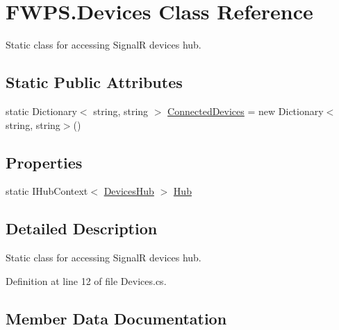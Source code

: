 \hypertarget{class_f_w_p_s_1_1_devices}{}\section{F\+W\+P\+S.\+Devices Class Reference}
\label{class_f_w_p_s_1_1_devices}


Static class for accessing SignalR devices hub.  


\subsection*{Static Public Attributes}
\begin{DoxyCompactItemize}
\item 
static Dictionary$<$ string, string $>$ \mbox{\hyperlink{class_f_w_p_s_1_1_devices_a8334d36e787ab0a9c07a05974bbb5ee0}{Connected\+Devices}} = new Dictionary$<$string, string$>$()
\end{DoxyCompactItemize}
\subsection*{Properties}
\begin{DoxyCompactItemize}
\item 
static I\+Hub\+Context$<$ \mbox{\hyperlink{class_f_w_p_s_1_1_devices_hub}{Devices\+Hub}} $>$ \mbox{\hyperlink{class_f_w_p_s_1_1_devices_a417be10bd7ef62349833bb0d6d32c235}{Hub}}
\end{DoxyCompactItemize}


\subsection{Detailed Description}
Static class for accessing SignalR devices hub. 

Definition at line 12 of file Devices.\+cs.



\subsection{Member Data Documentation}
\mbox{\label{class_f_w_p_s_1_1_devices_a8334d36e787ab0a9c07a05974bbb5ee0}} 
